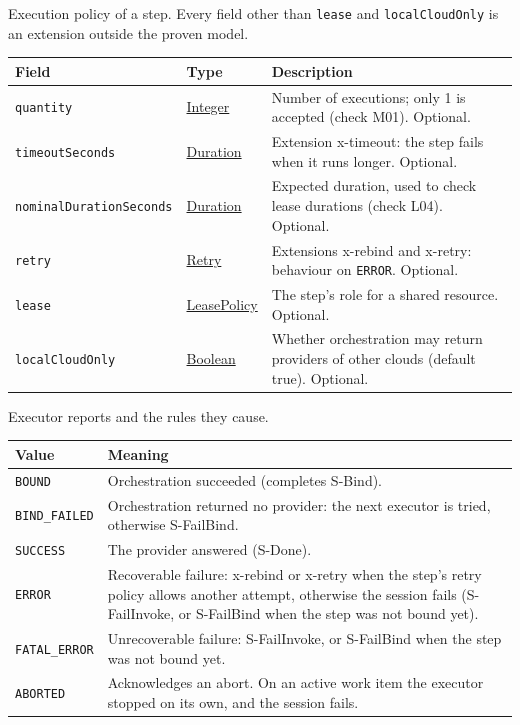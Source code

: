 \documentclass[a4paper]{arrowhead}
\newcommand{\mref}[1]{{\textcolor{ArrowheadPurple}{\hyperref[sec:model:#1]{#1}}}}
\newcommand{\pref}[1]{{\textcolor{ArrowheadGrey}{\hyperref[sec:model:primitives:#1]{#1}}}}
\begin{document}
Execution policy of a step. Every field other than \texttt{lease} and \texttt{local\allowbreak{}Cloud\allowbreak{}Only} is an extension outside the proven model.

{\small
\begin{longtable}{|p{3.9cm}|p{4.4cm}|p{7.5cm}|}

\hline
\rowcolor{gray!33} Field & Type & Description \\ \hline
\endhead
\texttt{quantity} & \pref{Integer} & Number of executions; only 1 is accepted (check M01). Optional. \\ \hline
\texttt{timeout\allowbreak{}Seconds} & \pref{Duration} & Extension x-timeout: the step fails when it runs longer. Optional. \\ \hline
\texttt{nominal\allowbreak{}Duration\allowbreak{}Seconds} & \pref{Duration} & Expected duration, used to check lease durations (check L04). Optional. \\ \hline
\texttt{retry} & \mref{Retry} & Extensions x-rebind and x-retry: behaviour on \texttt{ERROR}. Optional. \\ \hline
\texttt{lease} & \mref{LeasePolicy} & The step's role for a shared resource. Optional. \\ \hline
\texttt{local\allowbreak{}Cloud\allowbreak{}Only} & \pref{Boolean} & Whether orchestration may return providers of other clouds (default true). Optional. \\ \hline
\end{longtable}
}

Executor reports and the rules they cause.

{\small
\begin{longtable}{|p{3.9cm}|p{11.9cm}|}

\hline
\rowcolor{gray!33} Value & Meaning \\ \hline
\endhead
\texttt{BOUND} & Orchestration succeeded (completes S-Bind). \\ \hline
\texttt{BIND\_FAILED} & Orchestration returned no provider: the next executor is tried, otherwise S-FailBind. \\ \hline
\texttt{SUCCESS} & The provider answered (S-Done). \\ \hline
\texttt{ERROR} & Recoverable failure: x-rebind or x-retry when the step's retry policy allows another attempt, otherwise the session fails (S-FailInvoke, or S-FailBind when the step was not bound yet). \\ \hline
\texttt{FATAL\_ERROR} & Unrecoverable failure: S-FailInvoke, or S-FailBind when the step was not bound yet. \\ \hline
\texttt{ABORTED} & Acknowledges an abort. On an active work item the executor stopped on its own, and the session fails. \\ \hline
\end{longtable}
}
\end{document}
